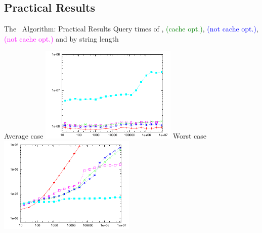 \documentclass{beamer}
\begin{document}
\subsection{Practical Results}
\begin{frame}{The \fprintk\ Algorithm: Practical Results}
    Query times of
    \textcolor{red}{},
    \textcolor{green}{\fprint[2] (cache opt.)},
    \textcolor{blue}{\fprint[3] (not cache opt.)},
    \textcolor{magenta}{\fprint[\logceil] (not cache opt.)} and
    \textcolor{cyan}{}
    by string length
    \begin{multicols}{2}{
        \begin{center}
            Average case
            \includegraphics[width=0.49\textwidth,type=pdf,ext=.pdf,read=.pdf]{../src/results/length-slides-cache-rand10.plt}
            \newpage
            Worst case
            \includegraphics[width=0.49\textwidth,type=pdf,ext=.pdf,read=.pdf]{../src/results/length-slides-cache-alla.plt}
        \end{center}
    }
    \end{multicols}
\end {frame}
\end{document}
